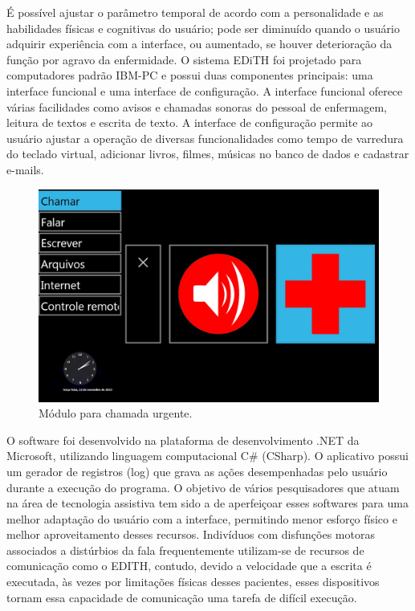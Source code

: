 \documentclass[twoside]{article}
\begin{document}
\begin{multicols}{2}
É possível ajustar o parâmetro temporal de acordo com a personalidade e as habilidades físicas e cognitivas do usuário; pode ser diminuído quando o usuário adquirir experiência com a interface, ou aumentado, se houver deterioração da função por agravo da enfermidade. O sistema EDiTH foi projetado para computadores padrão IBM-PC e possui duas componentes principais: uma interface funcional e uma interface de configuração. A interface funcional oferece várias facilidades como avisos e chamadas sonoras do pessoal de enfermagem, leitura de textos e escrita de texto. A interface de configuração permite ao usuário ajustar a operação de diversas funcionalidades como tempo de varredura do teclado virtual, adicionar livros, filmes, músicas no banco de dados e cadastrar e-mails.

\begin{figure}[H]
\label{fig:edith_chamar}
  \caption{Módulo para chamada urgente.}
  \centering
    \includegraphics[scale = 0.18]{edith_chamar.png}
\end{figure}

O software foi desenvolvido na plataforma de desenvolvimento .NET da Microsoft, utilizando linguagem computacional C\# (CSharp). O aplicativo possui um gerador de registros (log) que grava as ações desempenhadas pelo usuário durante a execução do programa. O objetivo de vários pesquisadores que atuam na área de tecnologia assistiva tem sido a de aperfeiçoar esses softwares para uma melhor adaptação do usuário com a interface, permitindo menor esforço físico e melhor aproveitamento desses recursos. Indivíduos com disfunções motoras associados a distúrbios da fala frequentemente utilizam-se de recursos de comunicação como o EDITH, contudo, devido a velocidade que a escrita é executada, às vezes por limitações físicas desses pacientes, esses dispositivos tornam essa capacidade de comunicação uma tarefa de difícil execução. 



\end{multicols}
\end{document}
